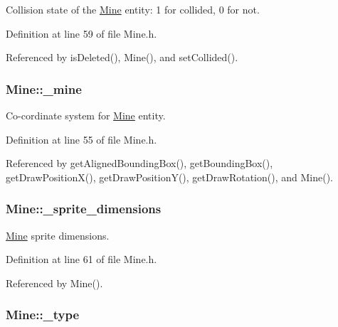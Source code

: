 Collision state of the \hyperlink{classMine}{Mine} entity\-: 1 for collided, 0 for not. 



Definition at line 59 of file Mine.\-h.



Referenced by is\-Deleted(), Mine(), and set\-Collided().

\hypertarget{classMine_ada4e9674ae02b3d3035decc350222aa8}{
\subsubsection[{\-\_\-mine}]{ Mine\-::\-\_\-mine\hspace{0.3cm}{\ttfamily [private]}}}\label{classMine_ada4e9674ae02b3d3035decc350222aa8}


Co-\/cordinate system for \hyperlink{classMine}{Mine} entity. 



Definition at line 55 of file Mine.\-h.



Referenced by get\-Aligned\-Bounding\-Box(), get\-Bounding\-Box(), get\-Draw\-Position\-X(), get\-Draw\-Position\-Y(), get\-Draw\-Rotation(), and Mine().

\hypertarget{classMine_a82e6153c008e77eea41dfac4bc665db5}{
\subsubsection[{\-\_\-sprite\-\_\-dimensions}]{ Mine\-::\-\_\-sprite\-\_\-dimensions\hspace{0.3cm}{\ttfamily [private]}}}\label{classMine_a82e6153c008e77eea41dfac4bc665db5}


\hyperlink{classMine}{Mine} sprite dimensions. 



Definition at line 61 of file Mine.\-h.



Referenced by Mine().

\hypertarget{classMine_a9f780de0af41828d0b03de8ecff36546}{
\subsubsection[{\-\_\-type}]{ Mine\-::\-\_\-type\hspace{0.3cm}{\ttfamily [private]}}}\label{classMine_a9f780de0af41828d0b03de8ecff36546}


